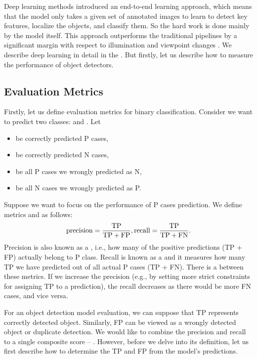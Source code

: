 Deep learning methods introduced an end-to-end learning approach, which means
that the model only takes a given set of annotated images to learn to detect key
features, localize the objects, and classify them. So the hard work is done
mainly by the model itself. This approach outperforms the traditional pipelines
by a significant margin with respect to illumination and viewpoint changes
\cite{outperforming}. We describe deep learning in detail in the
. But firstly, let us describe how to measure the
performance of object detectors.

\subsection{Evaluation Metrics}
Firstly, let us define evaluation metrics for binary classification. Consider we
want to predict two classes:  and . Let
\begin{itemize}
    \item {} be correctly predicted P cases,
    \item {} be correctly predicted N cases,
    \item {} be all P cases we wrongly predicted as N,
    \item {} be all N cases we wrongly predicted as P.
\end{itemize}
Suppose we want to focus on the performance of P cases prediction. We define
metrics  and  as follows:
$$
    \text{precision} = \frac{\text{TP}}{\text{TP} + \text{FP}}, \\
    \text{recall} = \frac{\text{TP}}{\text{TP} + \text{FN}}.
$$
Precision is also known as a , i.e., how many of
the positive predictions (TP + FP) actually belong to P class. Recall is known
as a  and it measures how many TP we have predicted out
of all actual P cases (TP + FN). There is a  between
these metrics. If we increase the precision (e.g., by setting more strict
constraints for assigning TP to a prediction), the recall decreases as there
would be more FN cases, and vice versa.

For an object detection model evaluation, we can suppose that TP represents
correctly detected object. Similarly, FP can be viewed as a wrongly detected
object or duplicate detection. We would like to combine the precision and recall
to a single composite score -- . However,
before we delve into its definition, let us first describe how to determine the
TP and FP from the model's predictions.

